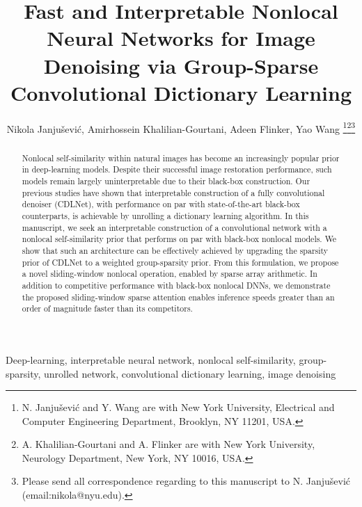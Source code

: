 \documentclass[lettersize,journal]{IEEEtran}
\newcommand{\soa}{state-of-the-art }
\begin{document}
\title{Fast and Interpretable Nonlocal Neural Networks for Image Denoising via Group-Sparse Convolutional Dictionary Learning}

\author{Nikola Janju\v{s}evi\'{c}, Amirhossein Khalilian-Gourtani, Adeen Flinker, Yao Wang 
\thanks{N. Janju\v{s}evi\'{c} and Y. Wang are with New York University, Electrical and Computer Engineering Department, Brooklyn, NY 11201, USA.}\thanks{A. Khalilian-Gourtani and A. Flinker are with New York University, Neurology Department, New York, NY 10016, USA.}\thanks{Please send all correspondence regarding to this manuscript to N. Janju\v{s}evi\'{c} (email:nikola@nyu.edu).}}



\maketitle

\begin{abstract}
    Nonlocal self-similarity within natural images has become an
    increasingly popular prior in deep-learning models. Despite their successful
    image restoration performance, such models remain largely
    uninterpretable due to their black-box construction. 
    Our previous studies have shown that interpretable
    construction of a fully convolutional denoiser (CDLNet), with performance on par with \soa
    black-box counterparts, is achievable by unrolling a dictionary learning algorithm.
    In this manuscript, we seek an interpretable construction of a convolutional
    network with a nonlocal self-similarity prior that performs on par with
    black-box nonlocal models. We show that such an architecture can be
    effectively achieved by upgrading the  sparsity prior of 
    CDLNet to a weighted group-sparsity prior. From this
    formulation, we propose a novel sliding-window nonlocal operation, enabled
    by sparse array arithmetic. In addition to competitive performance with black-box
    nonlocal DNNs, we demonstrate the proposed sliding-window sparse attention
    enables inference speeds greater than an order of magnitude faster than its competitors.
\end{abstract}

\begin{IEEEkeywords}
Deep-learning, interpretable neural network, nonlocal self-similarity,
group-sparsity, unrolled network, convolutional dictionary learning, image denoising
\end{IEEEkeywords}
\end{document}
